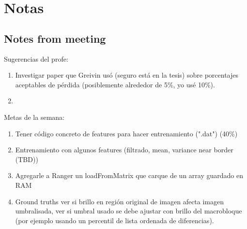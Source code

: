\documentclass[12pt,oneside]{book}
\begin{document}
  \newpage

  \section{Notas}
  \setlength\parindent{0pt}

  \subsection{Notes from meeting}

  Sugerencias del profe:
  \begin{enumerate}
    \item Investigar paper que Greivin usó (seguro está en la tesis) sobre porcentajes aceptables de pérdida (posiblemente alrededor de 5\%, yo usé 10\%).
    \item 
  \end{enumerate}

  Metas de la semana:
  \begin{enumerate}
    \item Tener código concreto de features para hacer entrenamiento (".dat") (40\%)
    \item Entrenamiento con algunos features (filtrado, mean, variance near border (TBD))
    \item Agregarle a Ranger un loadFromMatrix que carque de un array guardado en RAM
    \item Ground truths ver si brillo en región original de imagen afecta imagen umbralisada, ver si umbral usado se debe ajustar con brillo del macrobloque (por ejemplo usando un percentil de lista ordenada de diferencias).
  \end{enumerate}
\end{document}
